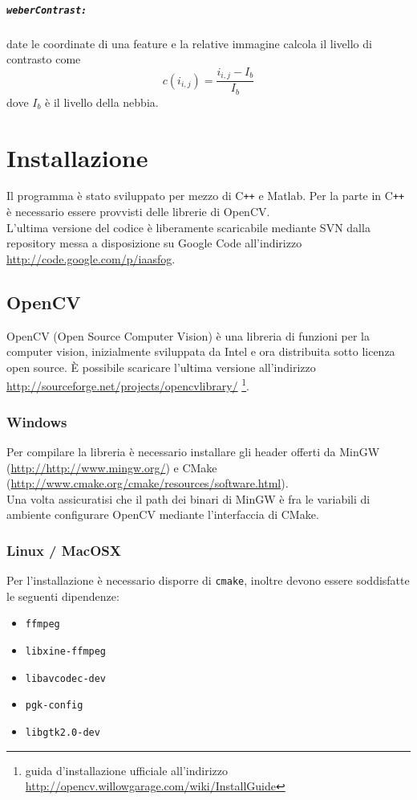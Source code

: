 \documentclass[12pt]{report}
\begin{document}
\paragraph*{\verb_weberContrast:_} date le coordinate di una feature e la relative immagine calcola il livello di contrasto come $$c\left(i_{i,j}\right)= \frac{i_{i,j}-I_b}{I_b}$$ dove $I_b$ \`e il livello della nebbia.



\chapter{Installazione}
\noindent Il programma \`e stato sviluppato per mezzo di C\verb|++| e Matlab. Per la parte in C\verb|++| \`e necessario essere provvisti delle librerie di OpenCV.\\
L'ultima versione del codice \`e liberamente scaricabile mediante SVN dalla repository messa a disposizione su Google Code all'indirizzo \url{http://code.google.com/p/iaasfog}.
\section{OpenCV}

OpenCV (Open Source Computer Vision) \`e una libreria di funzioni per la computer vision, inizialmente sviluppata da Intel e ora distribuita sotto licenza open source. \`E possibile scaricare l'ultima versione all'indirizzo \url{http://sourceforge.net/projects/opencvlibrary/} \footnote{guida d'installazione ufficiale all'indirizzo \url{http://opencv.willowgarage.com/wiki/InstallGuide}}.

\subsection{Windows}

Per compilare la libreria \`e necessario installare gli header offerti da MinGW (\url{http://http://www.mingw.org/}) e CMake (\url{http://www.cmake.org/cmake/resources/software.html}).\\
\noindent Una volta assicuratisi che il path dei binari di MinGW \`e fra le variabili di ambiente configurare OpenCV mediante l'interfaccia di CMake.

\subsection{Linux / MacOSX}

\noindent Per l'installazione \`e necessario disporre di \verb|cmake|, inoltre devono essere soddisfatte le seguenti dipendenze:
\begin{itemize}
\item \verb|ffmpeg|
\item \verb|libxine-ffmpeg|
\item \verb|libavcodec-dev|
\item \verb|pgk-config|
\item \verb|libgtk2.0-dev|
\end{itemize}
\end{document}
